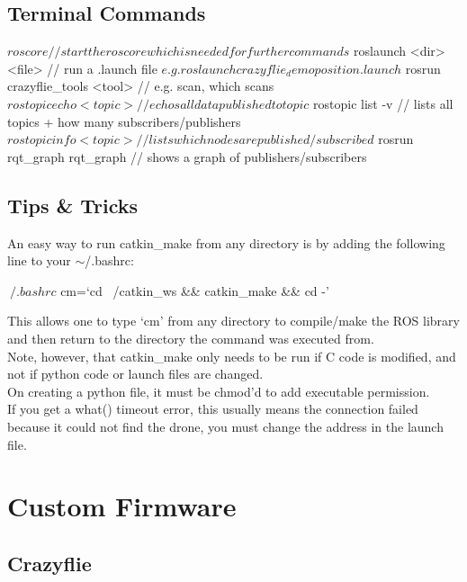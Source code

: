 \documentclass[]{article}
\begin{document}
\subsection{Terminal Commands}

\begin{terminal}
$ roscore // start the roscore which is needed for further commands
$ roslaunch <dir> <file> // run a .launch file
$	e.g. roslaunch crazyflie_demo position.launch
$ rosrun crazyflie_tools <tool> // e.g. scan, which scans
$ rostopic echo <topic> // echos all data published to topic
$ rostopic list -v // lists all topics + how many subscribers/publishers
$ rostopic info <topic> // lists which nodes are published/subscribed
$ rosrun rqt_graph rqt_graph // shows a graph of publishers/subscribers
\end{terminal}

\subsection{Tips \& Tricks}

\noindent An easy way to run catkin\_make from any directory is by adding the following line to your $\sim$/.bashrc:

\begin{terminal}
$ ~/.bashrc
$ cm=`cd ~/catkin_ws && catkin_make && cd -'
\end{terminal}

This allows one to type `cm' from any directory to compile/make the ROS library and then return to the directory the command was executed from. \\

Note, however, that catkin\_make only needs to be run if C code is modified, and not if python code or launch files are changed. \\

On creating a python file, it must be chmod'd to add executable permission. \\

If you get a what() timeout error, this usually means the connection failed because it could not find the drone, you must change the address in the launch file. \\

\section{Custom Firmware}

\subsection{Crazyflie}
\end{document}
